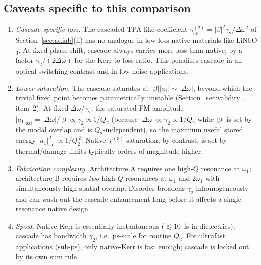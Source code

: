 \documentclass[11pt,a4paper]{article}
\newcommand{\chithree}{\chi^{(3)}}
\newcommand{\Dom}{\Delta\omega}
\begin{document}
\subsection*{Caveats specific to this comparison}

\begin{enumerate}\setlength{\itemsep}{2pt}
  \item \emph{Cascade-specific loss.}  The cascaded TPA-like
        coefficient $\gamma_\text{eff}^{(2)}=|\beta|^{2}\gamma_2/\Dom^{2}$
        of Section~\ref{sec:adiab}(ii) has no analogue in low-loss native materials
        like LiNbO$_3$.  At fixed phase shift, cascade always carries
        more loss than native, by a factor $\gamma_2/(2\Dom)$ for the
        Kerr-to-loss ratio.  This penalises cascade in
        all-optical-switching contrast and in low-noise applications.

  \item \emph{Lower saturation.}  The cascade saturates at
        $|\beta||a_1|\sim|\Dom|$, beyond which the trivial fixed
        point becomes parametrically unstable
        (Section~\ref{sec:validity}, item~2).  At fixed
        $\Dom/\gamma_2$, the saturated FM amplitude
        $|a_1|_\text{sat}=|\Dom|/|\beta|\propto\gamma_2\propto 1/Q_2$
        (because $|\Dom|\propto\gamma_2\propto 1/Q_2$ while $|\beta|$
        is set by the modal overlap and is $Q_2$-independent), so
        the maximum useful stored energy
        $|a_1|^{2}_\text{sat}\propto 1/Q_2^{\,2}$.  Native-$\chithree$
        saturation, by contrast, is set by thermal/damage limits
        typically orders of magnitude higher.

  \item \emph{Fabrication complexity.}  Architecture A requires one
        high-$Q$ resonance at $\omega_1$; architecture B requires
        \emph{two} high-$Q$ resonances at $\omega_1$ and $2\omega_1$
        with simultaneously high spatial overlap.  Disorder broadens
        $\gamma_2$ inhomogeneously and can wash out the cascade-enhancement
        long before it affects a single-resonance native design.

  \item \emph{Speed.}  Native Kerr is essentially instantaneous
        ($\lesssim 10$~fs in dielectrics); cascade has bandwidth
        $\gamma_2$, i.e.\ ps-scale for routine $Q_2$.  For
        ultrafast applications (sub-ps), only native-Kerr is fast
        enough; cascade is locked out by its own sum rule.
\end{enumerate}
\end{document}
